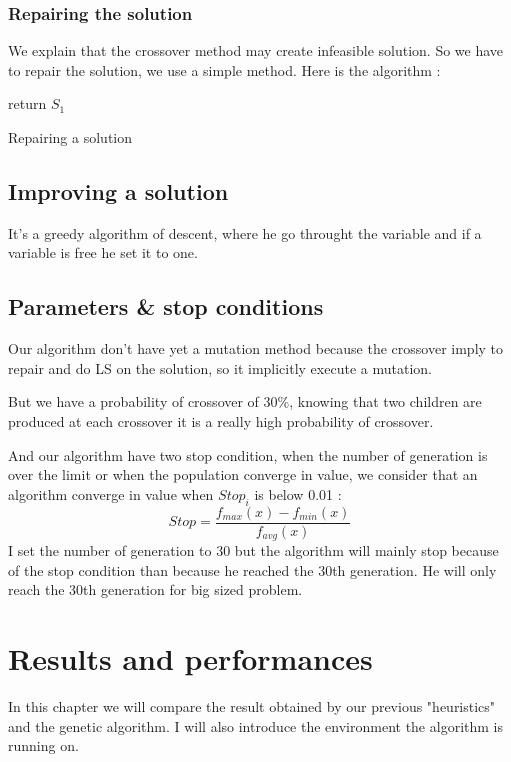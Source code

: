 \documentclass[12pt]{article}
\begin{document}
	\subsubsection{Repairing the solution}
	We explain that the crossover method may create infeasible solution. So we have to repair the solution, we use a simple method.
	Here is the algorithm :
	
	 \begin{algorithm}
	 	return	$S_1$
	 	\caption{Repairing a solution}
	 \end{algorithm}
 	\subsection{Improving a solution}
 	It's a greedy algorithm of descent, where he go throught the variable and if a variable  is free he set it to one.
 	\subsection{Parameters \& stop conditions}
 	Our algorithm don't have yet a mutation method because the crossover imply to repair and do LS on the solution, so it implicitly execute a mutation. 
 	
 	But we have a probability of crossover of 30\%, knowing that two children are produced at each crossover it is a really high probability of crossover.
 	
 	And our algorithm have two stop condition, when the number of generation is over the limit or when the population converge in value, we consider that an algorithm converge in value when $Stop_i$ is below 0.01 :
 	$$
 	Stop =  \frac{f_{max}(x) - f_{min}(x)}{f_{avg}(x)} 
 	$$
 	I set the number of generation to 30 but the algorithm will mainly stop because of the stop condition than because he reached the 30th generation. He will only reach the 30th generation for big sized problem.
 	\pagebreak
	\section{Results and performances}
	In this chapter we will compare the result obtained by our previous "heuristics" and the genetic algorithm. I will also introduce the environment the algorithm is running on.
\end{document}
